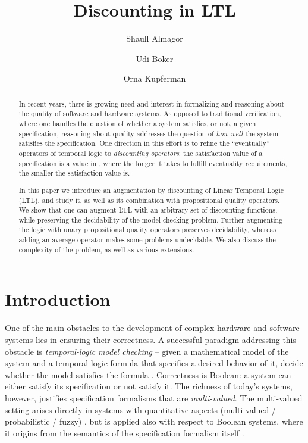 \documentclass{llncs}
\begin{document}
\belowdisplayskip=3pt
\abovedisplayskip=3pt
\title{Discounting in LTL}
\author{Shaull Almagor \and Udi Boker \and Orna Kupferman}
\maketitle

\begin{abstract}
In recent years, there is growing need and interest in formalizing and reasoning about the quality of software and hardware systems. As opposed to traditional verification, where one handles the question of whether a system satisfies, or not, a given specification, reasoning about quality addresses the question of \emph{how well} the system satisfies the specification. One direction in this effort is to refine the ``eventually'' operators of temporal logic to {\em discounting operators}: the satisfaction value of a specification is a value in , where the longer it takes to fulfill eventuality requirements, the smaller the satisfaction value is.

In this paper we introduce an augmentation by discounting of Linear Temporal Logic (LTL), and study it, as well as its combination with propositional quality operators. We show that one can augment LTL with an arbitrary set of discounting functions, while preserving the decidability of the model-checking problem. Further augmenting the logic with unary propositional quality operators preserves decidability, whereas adding an average-operator makes some problems undecidable.
We also discuss the complexity of the problem, as well as various extensions.
\end{abstract}



\section{Introduction}
\label{sec:introduction}
One of the main obstacles to the development of complex hardware and software systems lies in ensuring their correctness. A successful paradigm addressing this obstacle is {\em temporal-logic model checking\/} -- given a mathematical model of the system and a temporal-logic formula that specifies a desired behavior of it, decide whether the model satisfies the formula \cite{CGP99}.
Correctness is Boolean: a system can
either satisfy its specification or not satisfy it. The richness
of today's systems, however, justifies specification formalisms that
are {\em multi-valued}. The multi-valued setting arises directly in systems
with quantitative aspects (multi-valued / probabilistic / fuzzy) \cite{DR09b,DV12,FLS08,Kwi07,MLL04}, but is applied also with respect to Boolean systems, where it origins from the semantics of the specification formalism itself 
\cite{ABK13,AFHMS05}.
\end{document}
